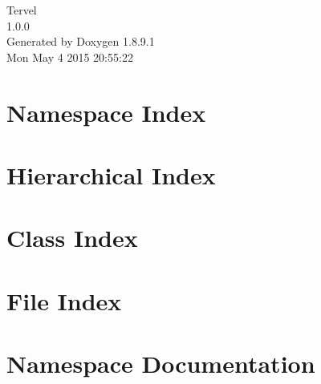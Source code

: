 \documentclass[twoside]{book}
\newcommand{\+}{\discretionary{\mbox{\scriptsize$\hookleftarrow$}}{}{}}
\newcommand{\clearemptydoublepage}{%
  \newpage{\pagestyle{empty}\cleardoublepage}%
}
\begin{document}
\hypersetup{pageanchor=false,
             bookmarks=true,
             bookmarksnumbered=true,
             pdfencoding=unicode
            }
\begin{titlepage}
\vspace*{7cm}
\begin{center}%
{\Large Tervel \\[1ex]\large 1.\+0.\+0 }\\
\vspace*{1cm}
{\large Generated by Doxygen 1.8.9.1}\\
\vspace*{0.5cm}
{\small Mon May 4 2015 20:55:22}\\
\end{center}
\end{titlepage}
\clearemptydoublepage
\tableofcontents
\clearemptydoublepage
{}
\hypersetup{pageanchor=true}

\chapter{Namespace Index}

\chapter{Hierarchical Index}

\chapter{Class Index}

\chapter{File Index}

\chapter{Namespace Documentation}













\end{document}
